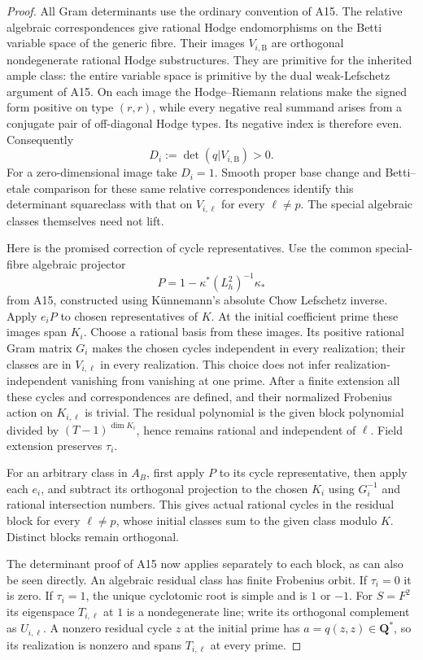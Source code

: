 \documentclass[11pt]{article}
\theoremstyle{remark}\newtheorem{remark}[theorem]{Remark}
\begin{document}
\begin{proof}
All Gram determinants use the ordinary convention of A15.
The relative algebraic correspondences give rational Hodge
endomorphisms on the Betti variable space of the generic
fibre. Their images $V_{i,\mathrm B}$ are orthogonal
nondegenerate rational Hodge substructures. They are primitive
for the inherited ample class: the entire variable space is
primitive by the dual weak-Lefschetz argument of A15.
On each image the Hodge--Riemann relations make the signed
form positive on type $(r,r)$, while every negative real
summand arises from a conjugate pair of off-diagonal Hodge
types. Its negative index is therefore even. Consequently
\[
              D_i:=\det(q|V_{i,\mathrm B})>0.
 \tag{A19.4}
\]
For a zero-dimensional image take $D_i=1$. Smooth proper
base change and Betti--etale comparison for these same
relative correspondences identify this determinant
squareclass with that on $V_{i,\ell}$ for every $\ell\ne p$.
The special algebraic classes themselves need not lift.

Here is the promised correction of cycle representatives.
Use the common special-fibre algebraic projector
\[
                  P=1-\kappa^*(L_h^2)^{-1}\kappa_*
 \tag{A19.5}
\]
from A15, constructed using K\"unnemann's absolute Chow
Lefschetz inverse. Apply $e_iP$ to chosen representatives
of $K$. At the initial coefficient prime these images span
$K_i$. Choose a rational basis from these images. Its
positive rational Gram matrix $G_i$ makes the chosen
cycles independent in every realization; their classes
are in $V_{i,\ell}$ in every realization. This choice
does not infer realization-independent vanishing from
vanishing at one prime. After a finite extension all
these cycles and correspondences are defined, and their
normalized Frobenius action on $K_{i,\ell}$ is trivial.
The residual polynomial is the given block polynomial
divided by $(T-1)^{\dim K_i}$, hence remains rational and
independent of $\ell$. Field extension preserves $\tau_i$.

For an arbitrary class in $A_B$, first apply $P$ to its
cycle representative, then apply each $e_i$, and subtract
its orthogonal projection to the chosen $K_i$ using
$G_i^{-1}$ and rational intersection numbers. This gives
actual rational cycles in the residual block for every
$\ell\ne p$, whose initial classes sum to the given
class modulo $K$. Distinct blocks remain orthogonal.

The determinant proof of A15 now applies separately to
each block, as can also be seen directly. An algebraic
residual class has finite Frobenius orbit. If $\tau_i=0$
it is zero. If $\tau_i=1$, the unique cyclotomic root is
simple and is $1$ or $-1$. For $S=F^2$ its eigenspace
$T_{i,\ell}$ at $1$ is a nondegenerate line; write its
orthogonal complement as $U_{i,\ell}$. A nonzero residual
cycle $z$ at the initial prime has
$a=q(z,z)\in\mathbf Q^*$, so its realization is nonzero
and spans $T_{i,\ell}$ at every prime.


\end{proof}
\end{document}

